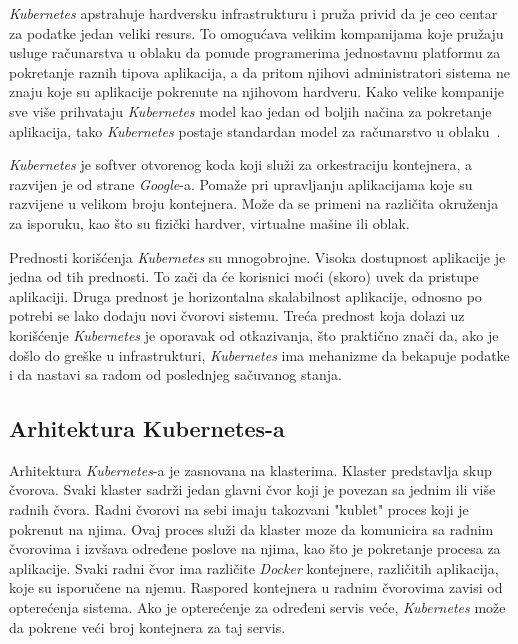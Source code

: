 \textit{Kubernetes} apstrahuje hardversku infrastrukturu i pruža privid da je ceo centar za podatke jedan veliki resurs. To omogućava
velikim kompanijama koje pružaju usluge računarstva u oblaku da ponude programerima jednostavnu platformu za pokretanje
raznih tipova aplikacija, a da pritom njihovi administratori sistema ne znaju koje su aplikacije pokrenute na njihovom
hardveru. Kako velike kompanije sve više prihvataju \textit{Kubernetes} model kao jedan od boljih načina za pokretanje aplikacija,
tako \textit{Kubernetes} postaje standardan model za računarstvo u oblaku~\cite{KIA}.

\textit{Kubernetes} je softver otvorenog koda koji služi za orkestraciju kontejnera, a razvijen je od 
strane \textit{Google}-a. Pomaže pri upravljanju aplikacijama koje su razvijene u velikom broju 
kontejnera. Može da se primeni na različita okruženja za isporuku, kao što su fizički 
hardver, virtualne mašine ili oblak.

Prednosti korišćenja \textit{Kubernetes} su mnogobrojne. Visoka dostupnost aplikacije je jedna od tih prednosti. 
To zači da će korisnici moći (skoro) uvek da pristupe aplikaciji. Druga prednost je horizontalna 
skalabilnost aplikacije, odnosno po potrebi se lako dodaju novi čvorovi sistemu. Treća prednost koja 
dolazi uz korišćenje \textit{Kubernetes} je oporavak od otkazivanja, što praktično znači da, ako je došlo do 
greške u infrastrukturi, \textit{Kubernetes} ima mehanizme da bekapuje podatke i da nastavi sa radom od 
poslednjeg sačuvanog stanja.

\subsection{Arhitektura Kubernetes-a}
Arhitektura \textit{Kubernetes}-a je zasnovana na klasterima. Klaster predstavlja skup čvorova. Svaki klaster sadrži
jedan glavni čvor koji je povezan sa jednim ili više radnih čvora. Radni čvorovi na sebi imaju 
takozvani "kublet" proces koji je pokrenut na njima. Ovaj proces služi da klaster moze da komunicira
sa radnim čvorovima i izvšava određene poslove na njima, kao što je pokretanje procesa za aplikacije.
Svaki radni čvor ima različite \textit{Docker} kontejnere, različitih aplikacija, koje su isporučene na njemu.
Raspored kontejnera u radnim čvorovima zavisi od opterećenja sistema. Ako je opterećenje za određeni 
servis veće, \textit{Kubernetes} može da pokrene veći broj kontejnera za taj servis. 

